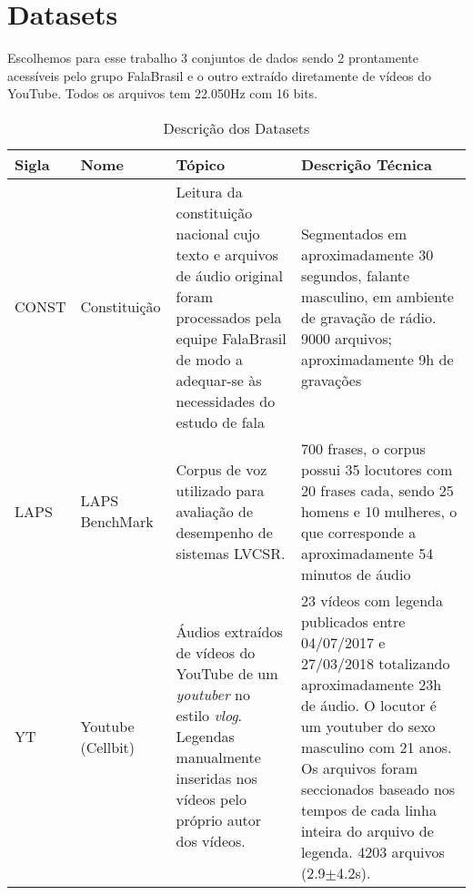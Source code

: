 \documentclass{article}
\begin{document}
\section{Datasets}

Escolhemos para esse trabalho 3 conjuntos de dados sendo 2 prontamente acessíveis pelo grupo FalaBrasil e o outro extraído diretamente de vídeos do YouTube. Todos os arquivos tem 22.050Hz com 16 bits.

\begin{center}
	\begin{table}[h!]
		\begin{tabular}{p{1cm}p{2cm}p{5cm}p{6cm}}
			\hline
			Sigla & Nome              & Tópico                                                                                                                                                                                            & Descrição Técnica                                                                                                                                                                                                                                                                           \\ \hline
			CONST & Constituição      & Leitura da constituição nacional cujo texto e arquivos de áudio original foram processados pela equipe FalaBrasil de modo a adequar-se às necessidades do estudo de fala                          & Segmentados em aproximadamente 30 segundos, falante masculino, em ambiente de gravação de rádio. 9000 arquivos; aproximadamente 9h de gravações                                                                                                                      \\
			\hline
			LAPS  & LAPS BenchMark    & Corpus de voz utilizado para avaliação de desempenho de sistemas LVCSR.                                                                                                                           & 700 frases, o corpus possui 35 locutores com 20 frases cada, sendo 25 homens e 10 mulheres, o que corresponde a aproximadamente 54 minutos de áudio                                                                                                                                         \\ \hline
			YT    & Youtube (Cellbit) & Áudios extraídos de vídeos do YouTube de um \textit{youtuber} no estilo \textit{vlog}. Legendas manualmente inseridas nos vídeos pelo próprio autor dos vídeos. & 23 vídeos com legenda publicados entre 04/07/2017 e 27/03/2018 totalizando aproximadamente 23h de áudio. O locutor é um youtuber do sexo masculino com 21 anos. Os arquivos foram seccionados baseado nos tempos de cada linha inteira do arquivo de legenda. 4203 arquivos (2.9$\pm$4.2s). \\ \hline
		\end{tabular}
		\caption{Descrição dos Datasets}
		\label{tab:datasets}
	\end{table}
\end{center}
\end{document}
